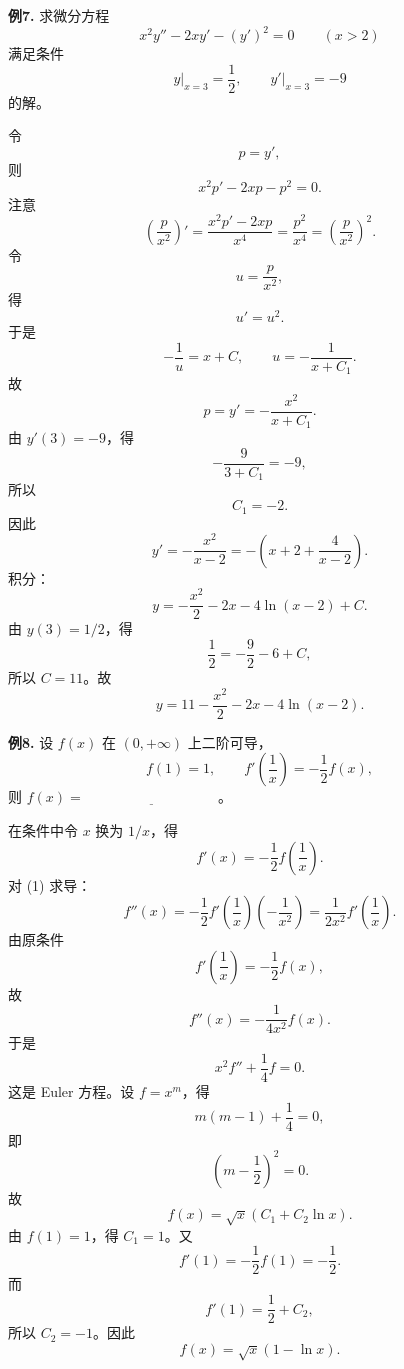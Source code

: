 \begin{problemblock}
\textbf{例7.} 求微分方程
\[
x^2y''-2xy'-(y')^2=0\qquad (x>2)
\]
满足条件
\[
\left.y\right|_{x=3}=\frac12,\qquad
\left.y'\right|_{x=3}=-9
\]
的解。
\end{problemblock}
\begin{solutionblock}
令
\[
p=y',
\]
则
\[
x^2p'-2xp-p^2=0.
\]
注意
\[
\left(\frac{p}{x^2}\right)'
=\frac{x^2p'-2xp}{x^4}
=\frac{p^2}{x^4}
=\left(\frac{p}{x^2}\right)^2.
\]
令
\[
u=\frac{p}{x^2},
\]
得
\[
u'=u^2.
\]
于是
\[
-\frac1u=x+C,
\qquad
u=-\frac1{x+C_1}.
\]
故
\[
p=y'=-\frac{x^2}{x+C_1}.
\]
由 \(y'(3)=-9\)，得
\[
-\frac{9}{3+C_1}=-9,
\]
所以
\[
C_1=-2.
\]
因此
\[
y'=-\frac{x^2}{x-2}
=-\left(x+2+\frac4{x-2}\right).
\]
积分：
\[
y=-\frac{x^2}{2}-2x-4\ln(x-2)+C.
\]
由 \(y(3)=1/2\)，得
\[
\frac12=-\frac92-6+C,
\]
所以 \(C=11\)。故
\[
y=11-\frac{x^2}{2}-2x-4\ln(x-2).
\]
\end{solutionblock}

\begin{problemblock}
\textbf{例8.} 设 \(f(x)\) 在 \((0,+\infty)\) 上二阶可导，
\[
f(1)=1,\qquad f'\!\left(\frac1x\right)=-\frac12 f(x),
\]
则 \(f(x)=\underline{\hspace{4cm}}\)。
\end{problemblock}
\begin{solutionblock}
在条件中令 \(x\) 换为 \(1/x\)，得
\[
f'(x)=-\frac12 f\!\left(\frac1x\right). \tag{1}
\]
对 (1) 求导：
\[
f''(x)=-\frac12 f'\!\left(\frac1x\right)\left(-\frac1{x^2}\right)
=\frac1{2x^2}f'\!\left(\frac1x\right).
\]
由原条件
\[
f'\!\left(\frac1x\right)=-\frac12f(x),
\]
故
\[
f''(x)=-\frac1{4x^2}f(x).
\]
于是
\[
x^2f''+\frac14f=0.
\]
这是 Euler 方程。设 \(f=x^m\)，得
\[
m(m-1)+\frac14=0,
\]
即
\[
\left(m-\frac12\right)^2=0.
\]
故
\[
f(x)=\sqrt{x}(C_1+C_2\ln x).
\]
由 \(f(1)=1\)，得 \(C_1=1\)。又
\[
f'(1)=-\frac12f(1)=-\frac12.
\]
而
\[
f'(1)=\frac12+C_2,
\]
所以 \(C_2=-1\)。因此
\[
f(x)=\sqrt{x}(1-\ln x).
\]
\end{solutionblock}

